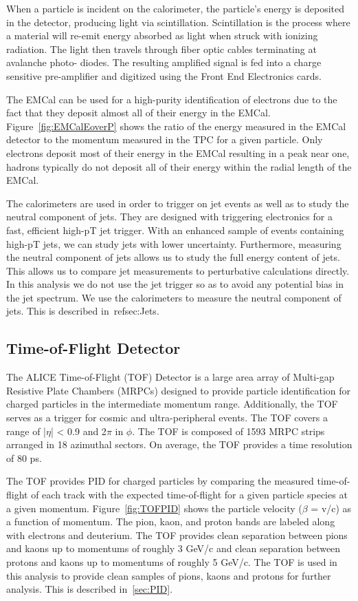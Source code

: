 When a particle is incident on the calorimeter, the particle’s energy is deposited in the detector, producing light via scintillation. Scintillation is the process where a material will re-emit energy absorbed as light when struck with ionizing radiation. The light then travels through fiber optic cables terminating at avalanche photo- diodes. The resulting amplified signal is fed into a charge sensitive pre-amplifier and digitized using the Front End Electronics cards.

The EMCal can be used for a high-purity identification of electrons due to the fact that they deposit almost all of their energy in the EMCal. Figure~\ref{fig:EMCalEoverP} shows the ratio of the energy measured in the EMCal detector to the momentum measured in the TPC for a given particle. Only electrons deposit most of their energy in the EMCal resulting in a peak near one, hadrons typically do not deposit all of their energy within the radial length of the EMCal.

The calorimeters are used in order to trigger on jet events as well as to study the neutral component of jets. They are designed with triggering electronics for a fast, efficient high-pT jet trigger. With an enhanced sample of events containing high-pT jets, we can study jets with lower uncertainty. Furthermore, measuring the neutral component of jets allows us to study the full energy content of jets. This allows us to compare jet measurements to perturbative calculations directly. In this analysis we do not use the jet trigger so as to avoid any potential bias in the jet spectrum. We use the calorimeters to measure the neutral component of jets. This is described in~ref{sec:Jets}.

\subsection{Time-of-Flight Detector}\label{subsec:TOF}

The ALICE Time-of-Flight (TOF) Detector is a large area array of Multi-gap Resistive Plate Chambers (MRPCs) designed to provide particle identification for charged particles in the intermediate momentum range. Additionally, the TOF serves as a trigger for cosmic and ultra-peripheral events. The TOF covers a range of |$\eta$| < 0.9 and 2$\pi$ in $\phi$. The TOF is composed of 1593 MRPC strips arranged in 18 azimuthal sectors. On average, the TOF provides a time resolution of 80 ps.

The TOF provides PID for charged particles by comparing the measured time-of-flight of each track with the expected time-of-flight for a given particle species at a given momentum. Figure~\ref{fig:TOFPID} shows the particle velocity ($\beta$ = v/c) as a function of momentum. The pion, kaon, and proton bands are labeled along with electrons and deuterium. The TOF provides clean separation between pions and kaons up to momentums of roughly 3 GeV/c and clean separation between protons and kaons up to momentums of roughly 5 GeV/c. The TOF is used in this analysis to provide clean samples of pions, kaons and protons for further analysis. This is described in~\ref{sec:PID}. 

